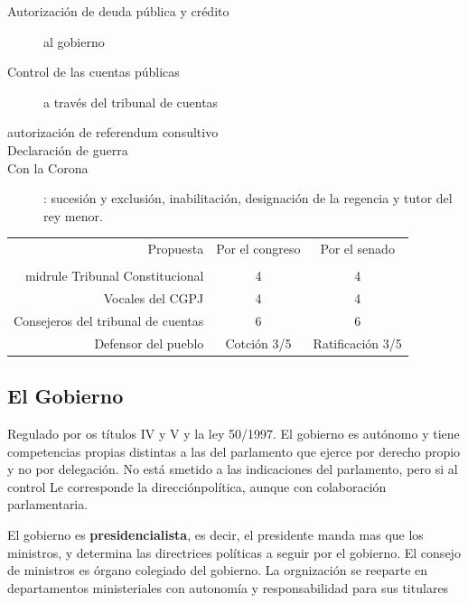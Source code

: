 \begin{description}
\begin{description}
            \item[Autorización de deuda pública y crédito] al gobierno
            \item[Control de las cuentas públicas] a través del tribunal de cuentas
        \end{description}
        \item[Otras funciones] \hfil
        \begin{description}
            \item[autorización de referendum consultivo]
            \item[Declaración de guerra]
            \item[Con la Corona]: sucesión y exclusión, inabilitación, designación de la regencia y tutor del rey menor.
        \end{description}
    \end{description}
    \begin{table}[H]	%
    \begin{tabular}{rcc}	%
        Propuesta & Por el congreso & Por el senado \\
        \\midrule	%
        Tribunal Constitucional & 4 & 4\\
        Vocales del CGPJ & 4 & 4 \\
        Consejeros del tribunal de cuentas & 6 & 6 \\
        Defensor del pueblo  & Cotción 3/5 & Ratificación 3/5 \\
    \end{tabular}
    \end{table}

\subsection{El Gobierno} %
    Regulado por os títulos IV y V y la ley 50/1997. El gobierno es autónomo y tiene competencias propias distintas a las del parlamento que ejerce por derecho propio y no por delegación. No está smetido a las indicaciones del parlamento, pero si al control Le corresponde la direcciónpolítica, aunque con colaboración parlamentaria. 

    El gobierno es \textbf{presidencialista}, es decir, el presidente manda mas que los ministros, y determina las directrices políticas a seguir por el gobierno. El consejo de ministros es órgano colegiado del gobierno. La orgnización se reeparte en departamentos ministeriales con autonomía y responsabilidad para sus titulares

